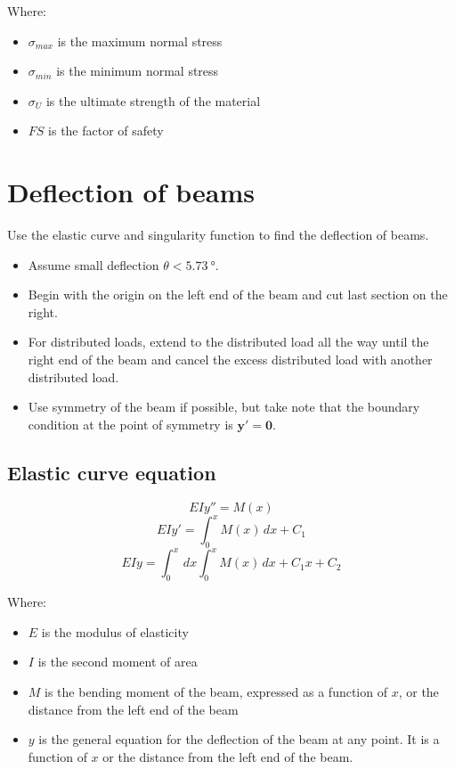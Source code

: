 \documentclass[11pt]{article}
\begin{document}
Where:
\begin{itemize}
\item \(\sigma_{max}\) is the maximum normal stress
\item \(\sigma_{min}\) is the minimum normal stress
\item \(\sigma_U\) is the ultimate strength of the material
\item \(FS\) is the factor of safety
\end{itemize}

\newpage
\section{Deflection of beams}
\label{sec:orgddd0abf}
Use the elastic curve and singularity function to find the deflection of beams.
\begin{itemize}
\item Assume small deflection \(\theta < \qty{5.73}{\degree}\).
\item Begin with the origin on the left end of the beam and cut last section on the right.
\item For distributed loads, extend to the distributed load all the way until the right end of the beam and cancel the excess distributed load with another distributed load.
\item Use symmetry of the beam if possible, but take note that the boundary condition at the point of symmetry is \(\boldsymbol{y' = 0}\).
\end{itemize}
\subsection{Elastic curve equation}
\label{sec:orgc4cea72}
\[EIy'' = M(x)\]
\[EIy' = \int_0^x M(x) \, dx + C_1\]
\[EIy = \int_0^x \, dx \int_0^x M(x) \, dx + C_1 x + C_2\]

Where:
\begin{itemize}
\item \(E\) is the modulus of elasticity
\item \(I\) is the second moment of area
\item \(M\) is the bending moment of the beam, expressed as a function of \(x\), or the distance from the left end of the beam
\item \(y\) is the general equation for the deflection of the beam at any point. It is a function of \(x\) or the distance from the left end of the beam.
\end{itemize}
\end{document}
